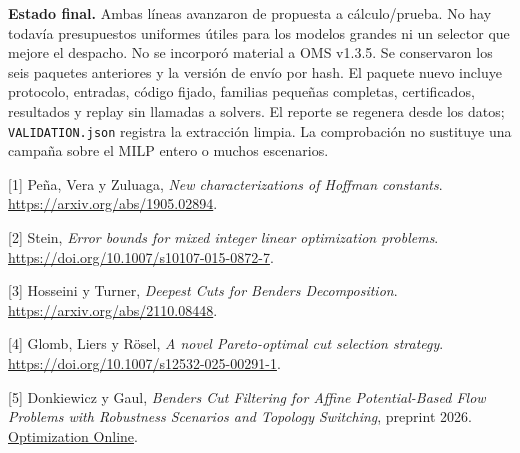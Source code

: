 \documentclass[10pt,a4paper]{article}
\begin{document}
\textbf{Estado final.} Ambas líneas avanzaron de propuesta a cálculo/prueba.
No hay todavía presupuestos uniformes útiles para los modelos grandes ni un
selector que mejore el despacho. No se incorporó material a OMS v1.3.5.
Se conservaron los seis paquetes anteriores y la versión de envío por hash.
El paquete nuevo incluye protocolo, entradas, código fijado, familias pequeñas
completas, certificados, resultados y replay sin llamadas a solvers. El reporte
se regenera desde los datos; \texttt{VALIDATION.json} registra la extracción limpia.
La comprobación no sustituye una campaña sobre el MILP entero o muchos escenarios.

\small
[1] Peña, Vera y Zuluaga, \emph{New characterizations of Hoffman constants}.
\url{https://arxiv.org/abs/1905.02894}.

[2] Stein, \emph{Error bounds for mixed integer linear optimization problems}.
\url{https://doi.org/10.1007/s10107-015-0872-7}.

[3] Hosseini y Turner, \emph{Deepest Cuts for Benders Decomposition}.
\url{https://arxiv.org/abs/2110.08448}.

[4] Glomb, Liers y Rösel, \emph{A novel Pareto-optimal cut selection strategy}.
\url{https://doi.org/10.1007/s12532-025-00291-1}.

[5] Donkiewicz y Gaul, \emph{Benders Cut Filtering for Affine Potential-Based Flow
Problems with Robustness Scenarios and Topology Switching}, preprint 2026.
\href{https://optimization-online.org/wp-content/uploads/2026/04/donkiewicz2026benderscutfiltering.pdf}{Optimization Online}.
\end{document}
